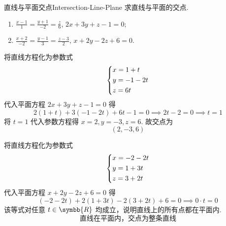 \begin{problem}{直线与平面交点}{Intersection-Line-Plane}
    求直线与平面的交点.
    \begin{enumerate}
        \item $\frac{x-1}{1} = \frac{y+1}{-2} = \frac{z}{6}$, $2x + 3y + z - 1 = 0$;
        \item $\frac{x+2}{-2} = \frac{y-1}{3} = \frac{z-3}{2}$, $x + 2y - 2z + 6 = 0$.
    \end{enumerate}
\end{problem}

\begin{solution}
    将直线方程化为参数式
    \begin{equation}
        \begin{dcases} x = 1 + t \\ y = -1 - 2t \\ z = 6t \end{dcases}
    \end{equation}
    代入平面方程 $2x + 3y + z - 1 = 0$ 得
    \begin{equation}
        2(1 + t) + 3(-1 - 2t) + 6t - 1 = 0 \implies 2t - 2 = 0 \implies t = 1
    \end{equation}
    将 $t = 1$ 代入参数方程得 $x = 2, y = -3, z = 6$. 故交点为
    \begin{equation}
        \boxed{(2, -3, 6)}
    \end{equation}

    将直线方程化为参数式
    \begin{equation}
        \begin{dcases} x = -2 - 2t \\ y = 1 + 3t \\ z = 3 + 2t \end{dcases}
    \end{equation}
    代入平面方程 $x + 2y - 2z + 6 = 0$ 得
    \begin{equation}
        (-2 - 2t) + 2(1 + 3t) - 2(3 + 2t) + 6 = 0 \implies 0 \cdot t = 0
    \end{equation}
    该等式对任意 $t \in \symbb{R}$ 均成立，说明直线上的所有点都在平面内.
    \begin{equation}
        \boxed{\text{直线在平面内，交点为整条直线}}
    \end{equation}
\end{solution}


